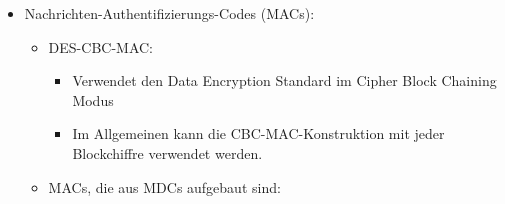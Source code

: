 \documentclass[a4paper]{article}
\begin{document}
\begin{multicols}{3}
\begin{itemize}
\begin{itemize}
                        \begin{itemize}
                            \item
                                  Ebenfalls von der National Security Agency (NSA) entwickelt
                            \item
                                  Auch Merkle-Dåmgard-Verfahren
                            \item
                                  Größere Blockgröße \& komplexere Rundenfunktion
                        \end{itemize}
                  \item
                        Sicherer Hash-Algorithmus 3 (SHA-3, Keccak)

                        \begin{itemize}
                            \item
                                  Gewinner eines offenen Wettbewerbs
                            \item
                                  Sogenannte Sponge-Konstruktion
                            \item
                                  Vielseitiger als frühere Hash-Funktionen
                        \end{itemize}
              \end{itemize}
        \item
              Nachrichten-Authentifizierungs-Codes (MACs):

              \begin{itemize}
                  \item
                        DES-CBC-MAC:

                        \begin{itemize}
                            \item
                                  Verwendet den Data Encryption Standard im Cipher Block Chaining
                                  Modus
                            \item
                                  Im Allgemeinen kann die CBC-MAC-Konstruktion mit jeder
                                  Blockchiffre verwendet werden.
                        \end{itemize}
                  \item
                        MACs, die aus MDCs aufgebaut sind:


\end{itemize}
\end{itemize}
\end{multicols}
\end{document}
